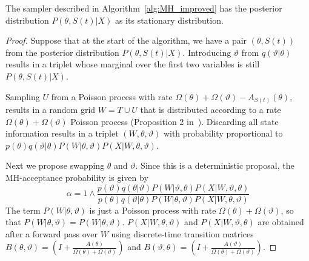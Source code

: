 \begin{proposition}
  The sampler described in Algorithm~\ref{alg:MH_improved} has the posterior
  distribution $P(\theta,S(t)|X)$ as its stationary distribution.
\end{proposition}
\begin{proof}
  Suppose that at the start of the algorithm, we have a pair $(\theta,S(t))$ from
  the posterior distribution $P(\theta,S(t)|X)$. Introducing $\vartheta$
  from $q(\vartheta|\theta)$ results in a triplet whose marginal over the first
  two variables is still $P(\theta,S(t)|X)$.

  Sampling $U$ from a Poisson process with rate $\Omega(\theta) +
  \Omega(\vartheta) - A_{S(t)}(\theta)$, results in a random grid $W = T \cup U$
  that is distributed according to a rate $\Omega(\theta) + \Omega(\vartheta)$
  Poisson process (Proposition 2 in~\cite{RaoTeh13}). Discarding all state 
  information results in a triplet $(W,\theta,\vartheta)$ with probability
  proportional to $p(\theta)q(\vartheta|\theta)P(W|\theta,\vartheta)
  P(X|W,\theta,\vartheta)$.

Next we propose swapping $\theta$ and $\vartheta$. Since this
is a deterministic proposal, the MH-acceptance probability is given by
$$\alpha = 1 \wedge \frac{p(\vartheta)q(\theta|\vartheta)P(W|\vartheta,\theta)
P(X|W,\vartheta,\theta)}{p(\theta)q(\vartheta|\theta)P(W|\theta,\vartheta)
P(X|W,\theta,\vartheta)}$$
The term $P(W|\theta,\vartheta)$ is just a Poisson process with rate $\Omega(\theta)+
\Omega(\vartheta)$, so that $P(W|\theta,\vartheta) = P(W|\theta,\vartheta)$. 
$P(X|W,\theta,\vartheta)$ and $P(X|W,\vartheta,\theta)$ are obtained
after a forward pass over $W$ using discrete-time transition matrices
$B(\theta,\vartheta) = \left(I + \frac{A(\theta)}{\Omega(\theta)+\Omega(\vartheta)}\right)$ 
and $B(\vartheta,\theta) = \left(I + \frac{A(\vartheta)}{\Omega(\theta)+\Omega(\vartheta)}\right)$. 


\end{proof}
